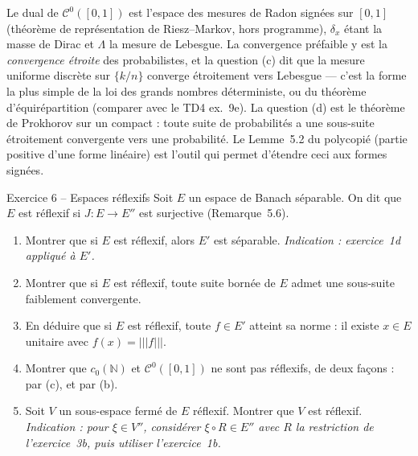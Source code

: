 \documentclass[11pt,a4paper]{article}
\newcommand{\N}{\mathbb{N}}
\newcommand{\opnorm}[1]{|\!|\!|#1|\!|\!|}
\newcommand{\Cz}{\mathcal{C}^0}
\theoremstyle{definition}
\begin{document}
\begin{commentaire}
Le dual de $\Cz([0,1])$ est l'espace des mesures de Radon signées sur $[0,1]$ (théorème de représentation de Riesz--Markov, hors programme), $\delta_x$ étant la masse de Dirac et $\Lambda$ la mesure de Lebesgue. La convergence préfaible y est la \emph{convergence étroite} des probabilistes, et la question (c) dit que la mesure uniforme discrète sur $\{k/n\}$ converge étroitement vers Lebesgue — c'est la forme la plus simple de la loi des grands nombres déterministe, ou du théorème d'équirépartition (comparer avec le TD4 ex.~9e). La question (d) est le théorème de Prokhorov sur un compact : toute suite de probabilités a une sous-suite étroitement convergente vers une probabilité. Le Lemme~5.2 du polycopié (partie positive d'une forme linéaire) est l'outil qui permet d'étendre ceci aux formes signées.
\end{commentaire}

\begin{exo}{Exercice 6 -- Espaces réflexifs}
Soit $E$ un espace de Banach séparable. On dit que $E$ est réflexif si $J:E\to E''$ est surjective (Remarque~5.6).
\begin{enumerate}[label=(\alph*)]
  \item Montrer que si $E$ est réflexif, alors $E'$ est séparable. \emph{Indication : exercice~1d appliqué à $E'$.}
  \item Montrer que si $E$ est réflexif, toute suite bornée de $E$ admet une sous-suite faiblement convergente.
  \item En déduire que si $E$ est réflexif, toute $f\in E'$ atteint sa norme : il existe $x\in E$ unitaire avec $f(x)=\opnorm f$.
  \item Montrer que $c_0(\N)$ et $\Cz([0,1])$ ne sont pas réflexifs, de deux façons : par (c), et par (b).
  \item Soit $V$ un sous-espace fermé de $E$ réflexif. Montrer que $V$ est réflexif. \emph{Indication : pour $\xi\in V''$, considérer $\xi\circ R\in E''$ avec $R$ la restriction de l'exercice~3b, puis utiliser l'exercice~1b.}
\end{enumerate}
\end{exo}
\end{document}
